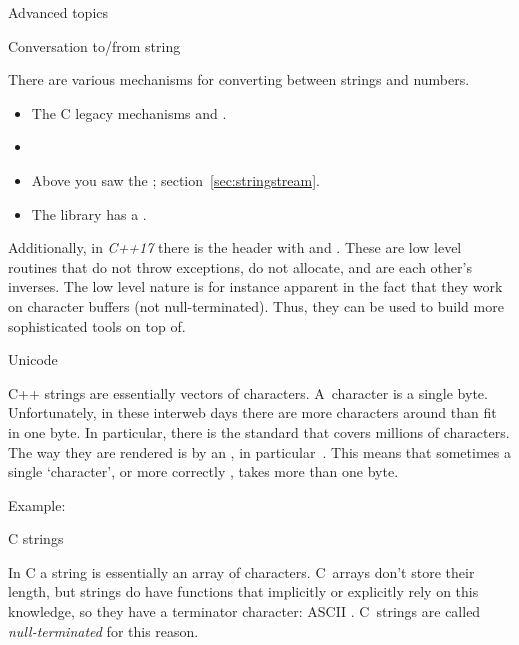  {Advanced topics}

 {Conversation to/from string}

There are various mechanisms for converting between strings and numbers.
\begin{itemize}
\item The C legacy mechanisms  and .
\item  {}
\item Above you saw the ; section~\ref{sec:stringstream}.
\item The  library has a .
\end{itemize}

Additionally, in \emph{C++17} there is the
 header with  and
. These are low level routines that do not
throw exceptions, do not allocate, and are each other's inverses. The
low level nature is for instance apparent in the fact that they work
on character buffers (not null-terminated). Thus, they can be used to
build more sophisticated tools on top of.

 {Unicode}

C++ strings are essentially vectors of characters. A~character is a
single byte. Unfortunately, in these interweb days there are more
characters around than fit in one byte. In particular, there is the
 standard that covers millions of
characters. The way they are rendered is by an
, in
particular~. This means that sometimes a single
`character', or more correctly , takes more than
one byte.

Example:

 {C strings}
\label{sec:cstring}

In C a string is essentially an array of characters. C~arrays don't
store their length, but strings do have functions that implicitly or
explicitly rely on this knowledge, so they have a terminator
character: ASCII . C~strings are called
\emph{null-terminated} for this reason.

